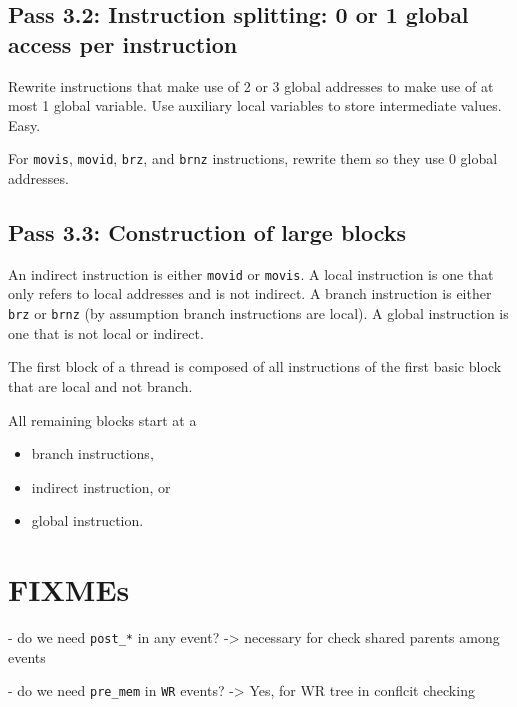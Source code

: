 \documentclass{llncs}
\begin{document}
\subsection*{Pass 3.2: Instruction splitting: 0 or 1 global access per instruction}

Rewrite instructions that make use of 2 or 3 global addresses to make use of at
most 1 global variable.
Use auxiliary local variables to store intermediate values. Easy.

For \verb!movis!, \verb!movid!, \verb!brz!, and \verb!brnz! instructions,
rewrite them so they use 0 global addresses.

\subsection*{Pass 3.3: Construction of large blocks}

An indirect instruction is either \verb!movid! or \verb!movis!.
A local instruction is one that only refers to local addresses and is not
indirect.
A branch instruction is either
\verb!brz! or \verb!brnz! (by assumption branch instructions are local).
A global instruction is one that is not local or indirect.

The first block of a thread is composed of all instructions of the first basic
block that are local and not branch.

All remaining blocks start at a
\begin{itemize}
\item branch instructions,
\item indirect instruction, or
\item global instruction.
\end{itemize}

\section{FIXMEs}

- do we need \verb!post_*! in any event? -> necessary for check shared parents among events

- do we need \verb!pre_mem! in \verb!WR! events? -> Yes, for WR tree in conflcit checking

\newpage



\end{document}
